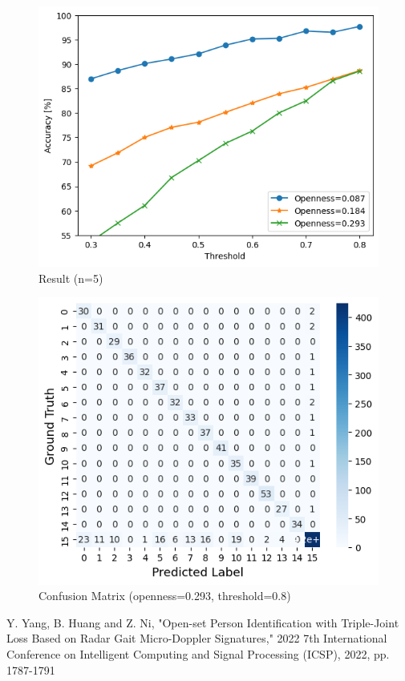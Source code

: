 \documentclass[dvipdfmx]{article}
\begin{document}
\begin{figure}[H]
\begin{center}
\includegraphics[width=0.8\linewidth]{./img/openset_graph2.png}
\end{center}
\caption{Result (n=5)}
\end{figure}

\begin{figure}[H]
\begin{center}
\includegraphics[width=0.8\linewidth]{./img/conf_threshold_1104.png}
\end{center}
\caption{Confusion Matrix (openness=0.293, threshold=0.8)}
\end{figure}


\begin{thebibliography}{99}
 Y. Yang, B. Huang and Z. Ni, "Open-set Person Identification with Triple-Joint Loss Based on Radar Gait Micro-Doppler Signatures," 2022 7th International Conference on Intelligent Computing and Signal Processing (ICSP), 2022, pp. 1787-1791
\end{thebibliography}
\end{document}
